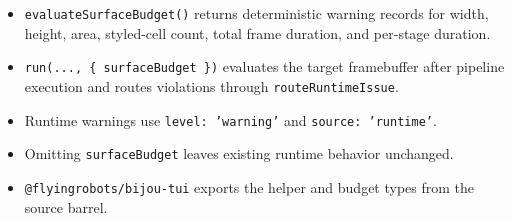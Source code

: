 \begin{itemize}
\tightlist
\item
  \texttt{e\allowbreak{}v\allowbreak{}a\allowbreak{}l\allowbreak{}u\allowbreak{}a\allowbreak{}t\allowbreak{}e\allowbreak{}S\allowbreak{}u\allowbreak{}r\allowbreak{}f\allowbreak{}a\allowbreak{}c\allowbreak{}e\allowbreak{}B\allowbreak{}u\allowbreak{}d\allowbreak{}g\allowbreak{}e\allowbreak{}t\allowbreak{}(\allowbreak{})} returns deterministic warning records for width, height, area, styled-cell count, total frame duration, and per-stage duration.
\item
  \texttt{r\allowbreak{}u\allowbreak{}n\allowbreak{}(\allowbreak{}.\allowbreak{}.\allowbreak{}.\allowbreak{},\allowbreak{} \allowbreak{}\{\allowbreak{} \allowbreak{}s\allowbreak{}u\allowbreak{}r\allowbreak{}f\allowbreak{}a\allowbreak{}c\allowbreak{}e\allowbreak{}B\allowbreak{}u\allowbreak{}d\allowbreak{}g\allowbreak{}e\allowbreak{}t\allowbreak{} \allowbreak{}\}\allowbreak{})} evaluates the target framebuffer after pipeline execution and routes violations through \texttt{r\allowbreak{}o\allowbreak{}u\allowbreak{}t\allowbreak{}e\allowbreak{}R\allowbreak{}u\allowbreak{}n\allowbreak{}t\allowbreak{}i\allowbreak{}m\allowbreak{}e\allowbreak{}I\allowbreak{}s\allowbreak{}s\allowbreak{}u\allowbreak{}e}.
\item
  Runtime warnings use \texttt{l\allowbreak{}e\allowbreak{}v\allowbreak{}e\allowbreak{}l\allowbreak{}:\allowbreak{} \allowbreak{}'\allowbreak{}w\allowbreak{}a\allowbreak{}r\allowbreak{}n\allowbreak{}i\allowbreak{}n\allowbreak{}g\allowbreak{}'} and \texttt{s\allowbreak{}o\allowbreak{}u\allowbreak{}r\allowbreak{}c\allowbreak{}e\allowbreak{}:\allowbreak{} \allowbreak{}'\allowbreak{}r\allowbreak{}u\allowbreak{}n\allowbreak{}t\allowbreak{}i\allowbreak{}m\allowbreak{}e\allowbreak{}'}.
\item
  Omitting \texttt{s\allowbreak{}u\allowbreak{}r\allowbreak{}f\allowbreak{}a\allowbreak{}c\allowbreak{}e\allowbreak{}B\allowbreak{}u\allowbreak{}d\allowbreak{}g\allowbreak{}e\allowbreak{}t} leaves existing runtime behavior unchanged.
\item
  \texttt{@\allowbreak{}f\allowbreak{}l\allowbreak{}y\allowbreak{}i\allowbreak{}n\allowbreak{}g\allowbreak{}r\allowbreak{}o\allowbreak{}b\allowbreak{}o\allowbreak{}t\allowbreak{}s\allowbreak{}/\allowbreak{}b\allowbreak{}i\allowbreak{}j\allowbreak{}o\allowbreak{}u\allowbreak{}-\allowbreak{}t\allowbreak{}u\allowbreak{}i} exports the helper and budget types from the source barrel.
\end{itemize}

